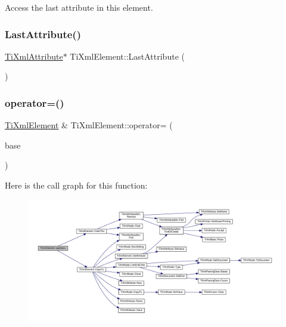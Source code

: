 Access the last attribute in this element. 

\mbox{\label{class_ti_xml_element_a222f81cf06155cd108f2a68d4d176004}} 
\subsubsection{\texorpdfstring{Last\+Attribute()}{LastAttribute()}\hspace{0.1cm}{\footnotesize\ttfamily [2/2]}}
{\footnotesize\ttfamily \hyperlink{class_ti_xml_attribute}{Ti\+Xml\+Attribute}$\ast$ Ti\+Xml\+Element\+::\+Last\+Attribute (\begin{DoxyParamCaption}{ }\end{DoxyParamCaption})\hspace{0.3cm}{\ttfamily [inline]}}

\mbox{\label{class_ti_xml_element_ad58d300f4cfc0016ffa6861ebb718a0b}} 
\subsubsection{\texorpdfstring{operator=()}{operator=()}}
{\footnotesize\ttfamily \hyperlink{class_ti_xml_element}{Ti\+Xml\+Element} \& Ti\+Xml\+Element\+::operator= (\begin{DoxyParamCaption}\item[{const \hyperlink{class_ti_xml_element}{Ti\+Xml\+Element} \&}]{base }\end{DoxyParamCaption})}

Here is the call graph for this function\+:
\nopagebreak
\begin{figure}[H]
\begin{center}
\leavevmode
\includegraphics[width=350pt]{class_ti_xml_element_ad58d300f4cfc0016ffa6861ebb718a0b_cgraph}
\end{center}
\end{figure}
\mbox{\label{class_ti_xml_element_af95c9165159fd9dfdcc5b894a3fcf85b}} 
